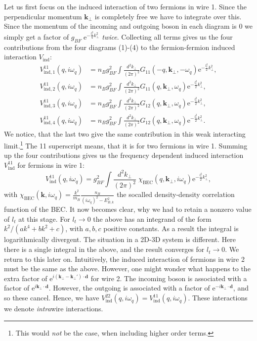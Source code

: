 Let us first focus on the induced interaction of two fermions in wire 1. Since the perpendicular momentum $\mathbf{k}_\perp$ is completely free we have to integrate over this. Since the momentum of the incoming and outgoing boson in each diagram is 0 we simply get a factor of $g_{BF}\; \text{e}^{-\frac{l_t^2}{4}k_\perp^2}$ \textit{twice}. Collecting all terms gives us the four contributions from the four diagrams (1)-(4) to the fermion-fermion induced interaction $V_{\text{ind}}$: 
\begin{align}
V^{11}_{\text{ind}, 1}(q,i\omega_q) &= n_Bg_{BF}^2\int\frac{d^2k_\perp}{(2\pi)^2}G_{11}(-q,\mathbf{k}_\perp,-\omega_q)\text{e}^{-\frac{l_t^2}{2}k_\perp^2}, \nonumber \\
V^{11}_{\text{ind}, 2}(q,i\omega_q) &= n_Bg_{BF}^2\int\frac{d^2k_\perp}{(2\pi)^2}G_{11}(q,\mathbf{k}_\perp,\omega_q)\text{e}^{-\frac{l_t^2}{2}k_\perp^2}, \nonumber \\
V^{11}_{\text{ind}, 3}(q,i\omega_q) &= n_Bg_{BF}^2\int\frac{d^2k_\perp}{(2\pi)^2}G_{12}(q,\mathbf{k}_\perp,\omega_q)\text{e}^{-\frac{l_t^2}{2}k_\perp^2}, \nonumber \\
V^{11}_{\text{ind}, 4}(q,i\omega_q) &= n_Bg_{BF}^2\int\frac{d^2k_\perp}{(2\pi)^2}G_{12}(q,\mathbf{k}_\perp,\omega_q)\text{e}^{-\frac{l_t^2}{2}k_\perp^2}. 
\end{align}
We notice, that the last two give the same contribution in this weak interacting limit.\footnote{This would \textit{not} be the case, when including higher order terms.} The 11 superscript means, that it is for two fermions in wire 1. Summing up the four contributions gives us the frequency dependent induced interaction $V^{11}_{\text{ind}}$ for fermions in wire 1:
\begin{equation}
V^{11}_{\text{ind}}(q,i\omega_q) = g_{BF}^2\int\frac{d^2k_\perp}{(2\pi)^2}\; \chi_\text{BEC}(q,\mathbf{k}_\perp,i\omega_q)\text{e}^{-\frac{l_t^2}{2}k_\perp^2}, 
\label{eq.V11indXBEC}
\end{equation}
with $\chi_\text{BEC}(\mathbf{k},i\omega_q) = \frac{k^2}{m_B}\frac{n_B}{(i\omega_q)^2 - E_{B,k}^2}$ the socalled density-density correlation function of the BEC. It now becomes clear, why we had to retain a nonzero value of $l_t$ at this stage. For $l_t\to 0$ the above has an integrand of the form $k^2/(ak^4 + bk^2 + c)$, with $a,b,c$ positive constants. As a result the integral is logarithmically divergent. The situation in a 2D-3D system is different. Here there is a single integral in the above, and the result converges for $l_t\to 0$. We return to this later on. Intuitively, the induced interaction of fermions in wire 2 must be the same as the above. However, one might wonder what happens to the extra factor of $\text{e}^{i(\mathbf{k}_\perp - \mathbf{k}_\perp')\cdot \mathbf{d}}$ for wire 2. The incoming boson is associated with a factor of $\text{e}^{i\mathbf{k}_\perp\cdot \mathbf{d}}$. However, the outgoing is associated with a factor of $\text{e}^{-i\mathbf{k}_\perp\cdot \mathbf{d}}$, and so these cancel. Hence, we have $V^{22}_{\text{ind}}(q,i\omega_q) = V^{11}_{\text{ind}}(q,i\omega_q)$. These interactions we denote \textit{intra}wire interactions. 

